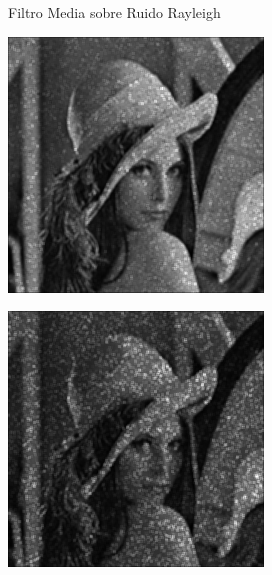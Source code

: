 \documentclass{beamer}
\begin{document}
\begin{frame}[fragile]{Filtro Media sobre Ruido Rayleigh}
	\begin{minipage}{0.25\linewidth}
		\centering
		\includegraphics[width=\linewidth]{../results/lena_rayleigh_xi1_media}
	\end{minipage}\hfill
	\begin{minipage}{0.25\linewidth}
		\centering
		\includegraphics[width=\linewidth]{../results/lena_rayleigh_xi2_media}

\end{minipage}
\end{frame}
\end{document}
